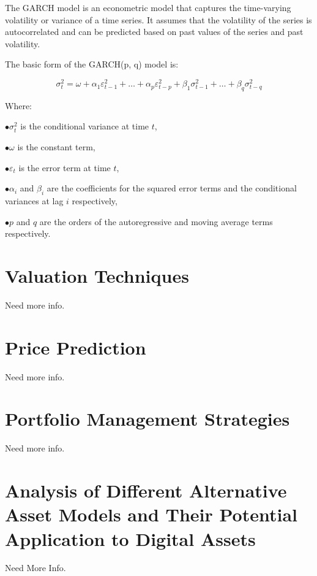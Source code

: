\documentclass{ledger}
\begin{document}
The GARCH model is an econometric model that captures the time-varying volatility or variance of a time series. It assumes that the volatility of the series is autocorrelated and can be predicted based on past values of the series and past volatility.

The basic form of the GARCH(p, q) model is:

\[
\sigma_{t}^2 = \omega + \alpha_{1}\varepsilon_{t-1}^2 + \ldots + \alpha_{p}\varepsilon_{t-p}^2 + \beta_{1}\sigma_{t-1}^2 + \ldots + \beta_{q}\sigma_{t-q}^2
\]

Where:

$ \bullet \sigma_{t}^2 $ is the conditional variance at time $ t $,

$ \bullet \omega $ is the constant term,

$ \bullet \varepsilon_{t} $ is the error term at time $ t $,

$ \bullet \alpha_{i} $ and $ \beta_{i} $ are the coefficients for the squared error terms and the conditional variances at lag $ i $ respectively,

$ \bullet p $ and $ q $ are the orders of the autoregressive and moving average terms respectively.


\section{Valuation Techniques}

Need more info.

\section{Price Prediction}

Need more info.

\section{Portfolio Management Strategies}

Need more info.

\section{Analysis of Different Alternative Asset Models and Their Potential Application to Digital Assets}

Need More Info.

\ledgernotes
\end{document}
